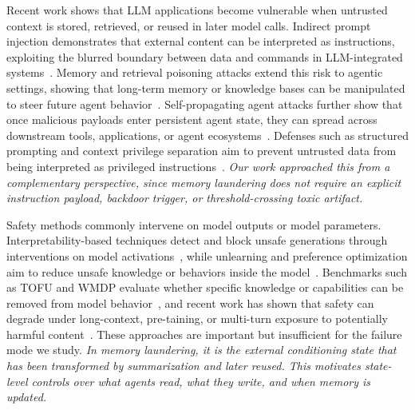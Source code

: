 Recent work shows that LLM applications become vulnerable when untrusted context is stored, retrieved, or reused in later model calls. Indirect prompt injection demonstrates that external content can be interpreted as instructions, exploiting the blurred boundary between data and commands in LLM-integrated systems~\citep{greshake2023not}. Memory and retrieval poisoning attacks extend this risk to agentic settings, showing that long-term memory or knowledge bases can be manipulated to steer future agent behavior~\citep{chen2024agentpoison}. Self-propagating agent attacks further show that once malicious payloads enter persistent agent state, they can spread across downstream tools, applications, or agent ecosystems~\citep{cohen2024here, zhang2026clawworm}. Defenses such as structured prompting and context privilege separation aim to prevent untrusted data from being interpreted as privileged instructions~\citep{chen2025struq}. 
\textit{Our work approached this from a complementary perspective, since memory laundering does not require an explicit instruction payload, backdoor trigger, or threshold-crossing toxic artifact.}

Safety methods commonly intervene on model outputs or model parameters. Interpretability-based techniques detect and block unsafe generations through interventions on model activations~\citep{goyal-etal-2025-breaking,wang2026causaldetox}, while unlearning and preference optimization aim to reduce unsafe knowledge or behaviors inside the model~\citep{jang2023knowledge,rafailov2023direct,yao2024large}. Benchmarks such as TOFU and WMDP evaluate whether specific knowledge or capabilities can be removed from model behavior~\citep{maini2024tofu,li2024wmdp}, and recent work has shown that safety can degrade under long-context, pre-taining, or multi-turn exposure to potentially harmful content~\citep{anil2024many,chiang2025web,xing2025llms}. These approaches are important but insufficient for the failure mode we study. \textit{In memory laundering, it is the external conditioning state that has been transformed by summarization and later reused. This motivates state-level controls over what agents read, what they write, and when memory is updated.}

